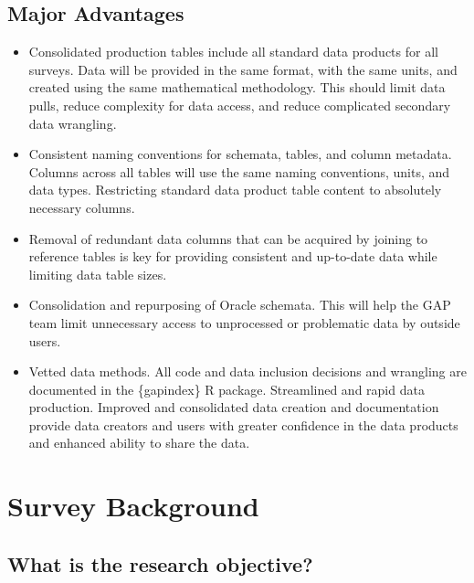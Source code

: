 \documentclass[
  letterpaper,
  oneside,
  open=any]{scrbook}
\begin{document}
\hypertarget{major-advantages}{%
\section*{Major Advantages}\label{major-advantages}}


\begin{itemize}
\item
  Consolidated production tables include all standard data products for
  all surveys. Data will be provided in the same format, with the same
  units, and created using the same mathematical methodology. This
  should limit data pulls, reduce complexity for data access, and reduce
  complicated secondary data wrangling.
\item
  Consistent naming conventions for schemata, tables, and column
  metadata. Columns across all tables will use the same naming
  conventions, units, and data types. Restricting standard data product
  table content to absolutely necessary columns.
\item
  Removal of redundant data columns that can be acquired by joining to
  reference tables is key for providing consistent and up-to-date data
  while limiting data table sizes.
\item
  Consolidation and repurposing of Oracle schemata. This will help the
  GAP team limit unnecessary access to unprocessed or problematic data
  by outside users.
\item
  Vetted data methods. All code and data inclusion decisions and
  wrangling are documented in the \{gapindex\} R package. Streamlined
  and rapid data production. Improved and consolidated data creation and
  documentation provide data creators and users with greater confidence
  in the data products and enhanced ability to share the data.
\end{itemize}

\hypertarget{survey-background}{%
\chapter{Survey Background}\label{survey-background}}

\hypertarget{what-is-the-research-objective}{%
\section{What is the research
objective?}\label{what-is-the-research-objective}}
\end{document}
